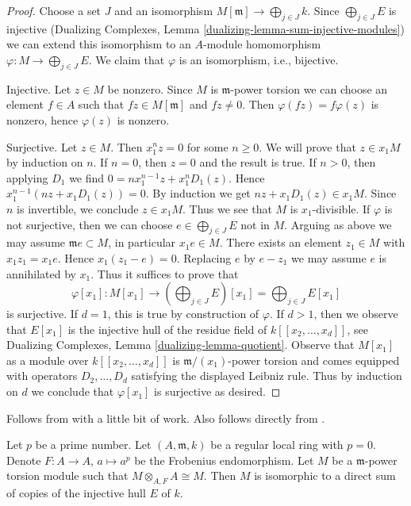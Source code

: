 \begin{proof}
Choose a set $J$ and an isomorphism $M[\mathfrak m] \to \bigoplus_{j \in J} k$.
Since $\bigoplus_{j \in J} E$ is injective
(Dualizing Complexes, Lemma \ref{dualizing-lemma-sum-injective-modules})
we can extend this isomorphism to an $A$-module homomorphism
$\varphi : M \to \bigoplus_{j \in J} E$.
We claim that $\varphi$ is an isomorphism, i.e., bijective.

\medskip\noindent
Injective. Let $z \in M$ be nonzero. Since $M$ is $\mathfrak m$-power torsion
we can choose an element $f \in A$ such that $fz \in M[\mathfrak m]$ and
$fz \not = 0$. Then $\varphi(fz) = f\varphi(z)$ is nonzero, hence
$\varphi(z)$ is nonzero.

\medskip\noindent
Surjective. Let $z \in M$. Then $x_1^n z = 0$ for some $n \geq 0$.
We will prove that $z \in x_1M$ by induction on $n$.
If $n = 0$, then $z = 0$ and the result is true.
If $n > 0$, then applying $D_1$ we find $0 = n x_1^{n - 1} z + x_1^nD_1(z)$.
Hence $x_1^{n - 1}(nz + x_1D_1(z)) = 0$. By induction we get
$nz + x_1D_1(z) \in x_1M$. Since $n$ is invertible, we conclude
$z \in x_1M$. Thus we see that $M$ is $x_1$-divisible.
If $\varphi$ is not surjective, then we can choose
$e \in \bigoplus_{j \in J} E$ not in $M$.
Arguing as above we may assume $\mathfrak m e \subset M$,
in particular $x_1 e \in M$. There exists an element
$z_1 \in M$ with $x_1 z_1 = x_1 e$. Hence
$x_1(z_1 - e) = 0$. Replacing $e$ by $e - z_1$
we may assume $e$ is annihilated by $x_1$.
Thus it suffices to prove that
$$
\varphi[x_1] :
M[x_1]
\longrightarrow
\left(\bigoplus\nolimits_{j \in J} E\right)[x_1] =
\bigoplus\nolimits_{j \in J} E[x_1]
$$
is surjective. If $d = 1$, this is true by construction of $\varphi$.
If $d > 1$, then we observe that $E[x_1]$ is the injective hull
of the residue field of $k[[x_2, \ldots, x_d]]$, see
Dualizing Complexes, Lemma \ref{dualizing-lemma-quotient}.
Observe that $M[x_1]$ as a module over $k[[x_2, \ldots, x_d]]$
is $\mathfrak m/(x_1)$-power torsion and comes
equipped with operators $D_2, \ldots, D_d$ satisfying
the displayed Leibniz rule.
Thus by induction on $d$ we conclude that $\varphi[x_1]$
is surjective as desired.
\end{proof}

\begin{lemma}
\label{lemma-structure-torsion-Frobenius-regular}
\begin{reference}
Follows from \cite[Corollary 3.6]{Huneke-Sharp} with a
little bit of work. Also follows directly from
\cite[Theorem 1.4]{Lyubeznik2}.
\end{reference}
Let $p$ be a prime number. Let $(A, \mathfrak m, k)$
be a regular local ring with $p = 0$. Denote $F : A \to A$, $a \mapsto a^p$
be the Frobenius endomorphism. Let $M$ be a $\mathfrak m$-power torsion module
such that $M \otimes_{A, F} A \cong M$. Then $M$ is isomorphic to a direct sum
of copies of the injective hull $E$ of $k$.
\end{lemma}

